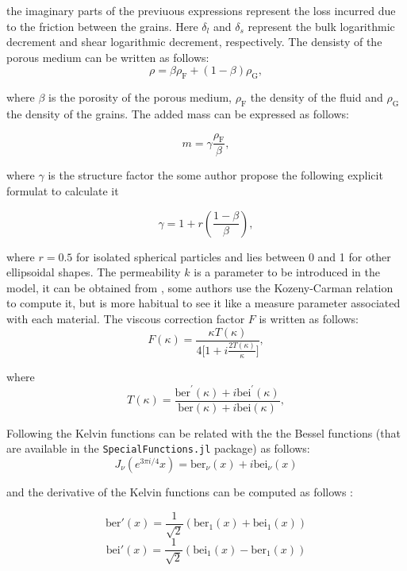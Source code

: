 \documentclass{article}[a4paper, 12pt]
\begin{document}
the imaginary parts of the previuous expressions represent the loss incurred due to the friction between the grains. Here $\delta_l$ and $\delta_s$ represent the bulk logarithmic decrement and shear logarithmic decrement, respectively. The densisty of the porous medium can be written as follows: 
$$ \rho=\beta\rho_{\mathrm{F}}+( 1-\beta) \rho_{\mathrm{G}},$$

where $\beta$ is the porosity of the porous medium, $\rho_{\mathrm{F}}$ the density of the fluid and $\rho_{\mathrm{G}}$ the density of the grains. The added mass can be expressed as follows:

$$ m = \gamma\frac{\rho_\mathrm{F}}{\beta},$$

where $\gamma$ is the structure factor the some author propose the  following explicit formulat to calculate it 

$$ \gamma = 1+r\left(\frac{1-\beta}{\beta}\right), $$ 

where $r=0.5$ for isolated spherical particles and lies between 0 and 1 for other ellipsoidal shapes. The permeability $k$ is a parameter to be introduced in the model, it can be obtained from \cite{chotiros2017acoustics}, some authors use the Kozeny-Carman relation to compute it, but is more habitual to see it like a measure parameter associated with each material. The viscous correction factor $F$ is written as follows:
\begin{equation}
    F ( \kappa)=\frac{\kappa T ( \kappa)} {4 \bigg[ 1+i\displaystyle\frac{2 T ( \kappa)} {\kappa} \bigg]},
\end{equation}

where 
\begin{equation}\label{eq_4}
    T ( \kappa)={\frac{\mathrm{b e r}^{\prime} ( \kappa)+i \mathrm{b e i}^{\prime} ( \kappa)} {\mathrm{b e r} ( \kappa)+i \mathrm{b e i} ( \kappa)}},
\end{equation}

Following \cite{kelvinfunctions} the Kelvin functions can be related with the the Bessel functions (that are available in the \texttt{SpecialFunctions.jl} package) as follows:
$$ J_\nu(e^{3\pi i/4}x) = \mathrm{ber}_\nu(x) + i\mathrm{bei}_\nu(x)$$

and the derivative of the Kelvin functions can be computed as follows  \cite{dlmf_kelvin_2024}:


$$ \mathrm{ber}'(x) = \frac{1}{\sqrt{2}}\left(\mathrm{ber}_1(x) + \mathrm{bei}_1(x)\right) $$
$$ \mathrm{bei}'(x) = \frac{1}{\sqrt{2}}\left(\mathrm{bei}_1(x) - \mathrm{ber}_1(x)\right) $$
\end{document}
